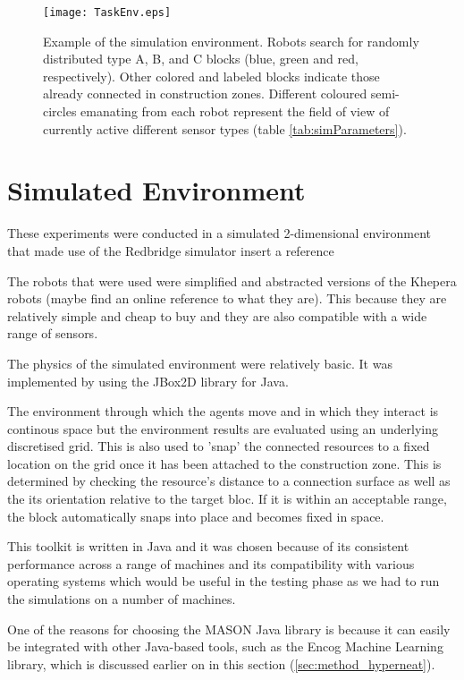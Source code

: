 \begin{figure}[t]
	\centering
	\texttt{[image: TaskEnv.eps]}
\caption{Example of the simulation environment.  Robots search for randomly distributed
type A, B, and C blocks (blue, green and red, respectively).  Other colored and labeled
blocks indicate those already connected in construction zones.
Different coloured semi-circles emanating from each
robot represent the field of view of currently active different sensor types (table \ref{tab:simParameters}).}\label{fig:taskEnv}
\end{figure}




\section{Simulated Environment}

These experiments were conducted in a simulated 2-dimensional environment that made use of the Redbridge simulator {insert a reference}

The robots that were used were simplified and abstracted versions of the Khepera robots (maybe find an online reference to what they are). This because they are relatively simple and cheap to buy and they are also compatible with a wide range of sensors.

The physics of the simulated environment were relatively basic. It was implemented by using the JBox2D library for Java.

The environment through which the agents move and in which they interact is continous space but the environment results are evaluated using an underlying discretised grid. This is also used to 'snap' the connected resources to a fixed location on the grid once it has been attached to the construction zone. This is determined by checking the resource's distance to a connection surface as well as the its orientation relative to the target bloc. If it is within an acceptable range, the block automatically snaps into place and becomes fixed in space.

This toolkit is written in Java and it was chosen because of its consistent performance across a range of machines and its compatibility with various operating systems which would be useful in the testing phase as we had to run the simulations on a number of machines.

One of the reasons for choosing the MASON Java library is because it can easily be integrated with other Java-based tools, such as the Encog Machine Learning library, which is discussed earlier on in this section (\ref{sec:method_hyperneat}).

